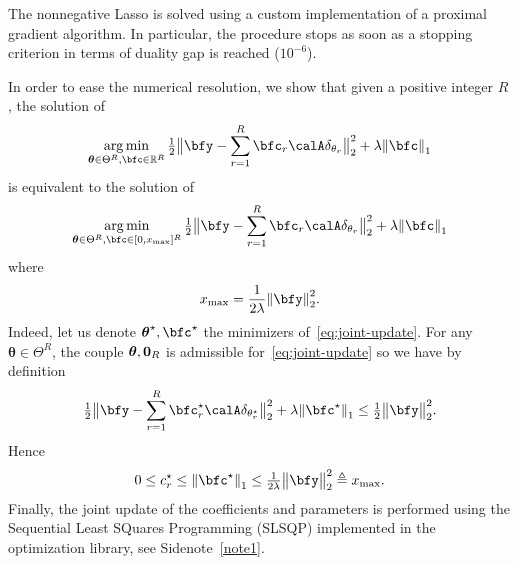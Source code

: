 The nonnegative Lasso is solved using a custom implementation of a proximal gradient algorithm.
In particular, the procedure stops as soon as a stopping criterion in terms of duality gap is reached ($10^{-6}$).

In order to ease the numerical resolution, we show that given a positive integer $R$, the solution of
\begin{equation}
	\label{eq:joint-update}
	\kargmin_{\boldsymbol{\theta}\in\Theta^R,\bfc\in\kR^R} \tfrac{1}{2} \big\Vert{\bfy - \sum_{r=1}^R \bfc_r \opObs\spike{\theta_r}}\big\Vert_2^2 + \lambda\kvvbar{\bfc}_1
\end{equation}
is equivalent to the solution of
\begin{equation}
	\kargmin_{\boldsymbol{\theta}\in\Theta^R,\bfc\in[0, x_{\max}]^R} \tfrac{1}{2} \big\Vert{\bfy - \sum_{r=1}^R \bfc_r \opObs\spike{\theta_r}}\big\Vert_2^2 + \lambda\kvvbar{\bfc}_1
\end{equation}
where
\begin{equation}
	x_{\max} = \frac{1}{2\lambda} \kvvbar{\bfy}_2^2.
\end{equation}
Indeed, let us denote $\boldsymbol{\theta}^\star,\bfc^\star$ the minimizers of~\eqref{eq:joint-update}.
For any $\boldsymbol{\theta}\in\Theta^R$, the couple $\boldsymbol{\theta},\mathbf{0}_R$ is admissible for~\eqref{eq:joint-update} so we have by definition
\begin{equation}
	\tfrac{1}{2}\big\Vert{\bfy - \sum_{r=1}^R \bfc^\star_r \opObs\spike{\theta^\star_r}}\big\Vert_2^2 + \lambda\kvvbar{\bfc^\star}_1
	\leq
	\tfrac{1}{2} \big\Vert \bfy \big\Vert_2^2
	.
\end{equation}
Hence
\begin{equation}
	0 \leq c_r^\star \leq \kvvbar{\bfc^\star}_1 \leq \tfrac{1}{2\lambda} \big\Vert \bfy \big\Vert_2^2 \triangleq x_{\max}
		.
\end{equation}
Finally, the joint update of the coefficients and parameters is performed using the Sequential Least SQuares Programming (SLSQP) implemented in the  optimization library, see Sidenote~\ref{note1}.
